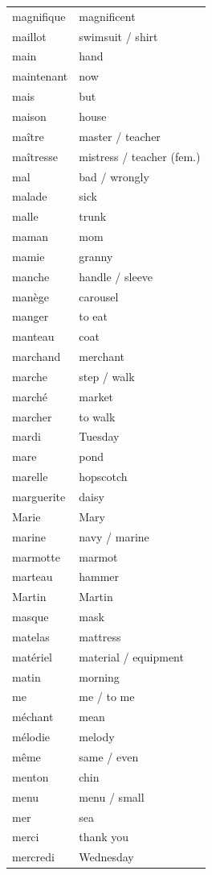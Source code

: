 \documentclass[12pt,a4paper]{article}
\begin{document}
\begin{longtable}{p{4cm} p{6cm}}
magnifique & magnificent \\
maillot & swimsuit / shirt \\
main & hand \\
maintenant & now \\
mais & but \\
maison & house \\
maître & master / teacher \\
maîtresse & mistress / teacher (fem.) \\
mal & bad / wrongly \\
malade & sick \\
malle & trunk \\
maman & mom \\
mamie & granny \\
manche & handle / sleeve \\
manège & carousel \\
manger & to eat \\
manteau & coat \\
marchand & merchant \\
marche & step / walk \\
marché & market \\
marcher & to walk \\
mardi & Tuesday \\
mare & pond \\
marelle & hopscotch \\
marguerite & daisy \\
Marie & Mary \\
marine & navy / marine \\
marmotte & marmot \\
marteau & hammer \\
Martin & Martin \\
masque & mask \\
matelas & mattress \\
matériel & material / equipment \\
matin & morning \\
me & me / to me \\
méchant & mean \\
mélodie & melody \\
même & same / even \\
menton & chin \\
menu & menu / small \\
mer & sea \\
merci & thank you \\
mercredi & Wednesday \\

\end{longtable}
\end{document}
